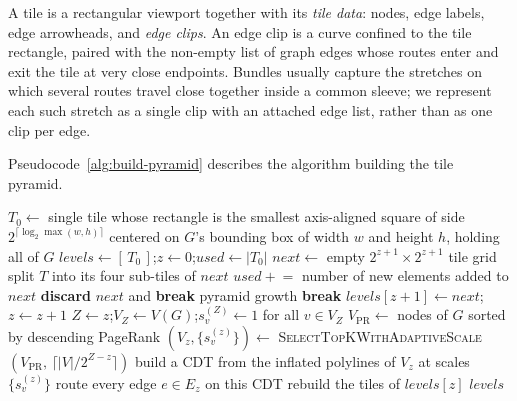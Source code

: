 A tile is a rectangular viewport together with its \emph{tile data}:
nodes, edge labels, edge arrowheads, and \emph{edge clips}. An edge
clip is a curve confined to the tile rectangle, paired with the
non-empty list of graph edges whose routes enter and exit the tile at
very close endpoints. Bundles usually capture the stretches on which
several routes travel close together inside a common sleeve; we
represent each such stretch as a single clip with an attached edge
list, rather than as one clip per edge.

Pseudocode~\ref{alg:build-pyramid} describes the algorithm building
the tile pyramid.
\begin{algorithm}[t]
\caption{\textsc{BuildTilePyramid}$(G, \mathit{TileCapacity}, \mathit{minTileSize}, \mathcal{M}_{\max})$}
\label{alg:build-pyramid}
\begin{algorithmic}[1]
\State $T_0 \gets$ single tile whose rectangle is the smallest axis-aligned square of side $2^{\lceil \log_2 \max(w,h)\rceil}$ centered on $G$'s bounding box of width $w$ and height $h$, holding all of $G$
\State $\mathit{levels} \gets [\,T_0\,]$;\quad $z \gets 0$;\quad $\mathit{used} \gets |T_0|$ 
  \State $\mathit{next} \gets$ empty $2^{z+1}{\times}2^{z+1}$ tile grid
   
    \State split $T$ into its four sub-tiles of $\mathit{next}$ \label{algln:split}
    \State $\mathit{used} \mathrel{+}=$ number of new elements added to $\mathit{next}$
     
      \State \textbf{discard} $\mathit{next}$ and \textbf{break} pyramid growth
    \EndIf
  \EndFor
    \State \textbf{break} 
  \EndIf
  \State $\mathit{levels}[z{+}1] \gets \mathit{next}$;\quad $z \gets z + 1$
\EndWhile
\State $Z \gets z$;\quad $V_Z \gets V(G)$;\quad $s_v^{(Z)} \gets 1$ for all $v\in V_Z$
\State $V_{\mathrm{PR}} \gets$ nodes of $G$ sorted by descending PageRank
  \State $(V_z, \{s_v^{(z)}\}) \gets$ \textsc{SelectTopKWithAdaptiveScale}$(V_{\mathrm{PR}},\, \lceil |V|/2^{Z-z}\rceil)$ 
  \State build a CDT from the inflated polylines of $V_z$ at scales $\{s_v^{(z)}\}$
  \State route every edge $e\in E_z$ on this CDT
  \State rebuild the tiles of $\mathit{levels}[z]$ \label{algln:rebuild}
\EndFor
\State \Return $\mathit{levels}$
\end{algorithmic}
\end{algorithm}



